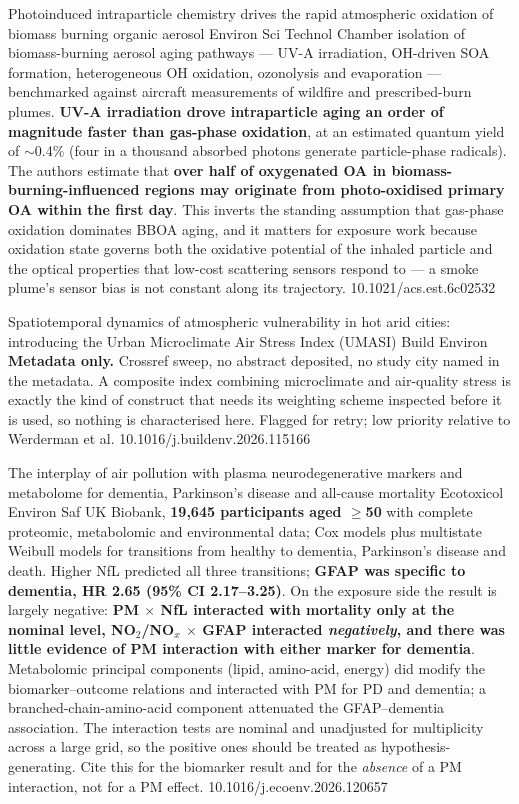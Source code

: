 \documentclass[10pt]{article}
\begin{document}
{Photoinduced intraparticle chemistry drives the rapid atmospheric oxidation of biomass burning organic aerosol}
{Environ Sci Technol}
{Chamber isolation of biomass-burning aerosol aging pathways --- UV-A irradiation,
OH-driven SOA formation, heterogeneous OH oxidation, ozonolysis and evaporation ---
benchmarked against aircraft measurements of wildfire and prescribed-burn plumes.
\textbf{UV-A irradiation drove intraparticle aging an order of magnitude faster than
gas-phase oxidation}, at an estimated quantum yield of $\sim$0.4\% (four in a thousand
absorbed photons generate particle-phase radicals). The authors estimate that
\textbf{over half of oxygenated OA in biomass-burning-influenced regions may originate
from photo-oxidised primary OA within the first day}. This inverts the standing
assumption that gas-phase oxidation dominates BBOA aging, and it matters for exposure
work because oxidation state governs both the oxidative potential of the inhaled particle
and the optical properties that low-cost scattering sensors respond to --- a smoke plume's
sensor bias is not constant along its trajectory.}
{10.1021/acs.est.6c02532}

{Spatiotemporal dynamics of atmospheric vulnerability in hot arid cities: introducing the Urban Microclimate Air Stress Index (UMASI)}
{Build Environ}
{\textbf{Metadata only.} Crossref sweep, no abstract deposited, no study city named in the
metadata. A composite index combining microclimate and air-quality stress is exactly the
kind of construct that needs its weighting scheme inspected before it is used, so nothing
is characterised here. Flagged for retry; low priority relative to Werderman et al.}
{10.1016/j.buildenv.2026.115166}

\clearpage


{The interplay of air pollution with plasma neurodegenerative markers and metabolome for dementia, Parkinson's disease and all-cause mortality}
{Ecotoxicol Environ Saf}
{UK Biobank, \textbf{19{,}645 participants aged $\geq$50} with complete proteomic,
metabolomic and environmental data; Cox models plus multistate Weibull models for
transitions from healthy to dementia, Parkinson's disease and death. Higher NfL predicted
all three transitions; \textbf{GFAP was specific to dementia, HR 2.65 (95\% CI
2.17--3.25)}. On the exposure side the result is largely negative: \textbf{PM $\times$
NfL interacted with mortality only at the nominal level, NO$_2$/NO$_x$ $\times$ GFAP
interacted \emph{negatively}, and there was little evidence of PM interaction with either
marker for dementia}. Metabolomic principal components (lipid, amino-acid, energy) did
modify the biomarker--outcome relations and interacted with PM for PD and dementia; a
branched-chain-amino-acid component attenuated the GFAP--dementia association. The
interaction tests are nominal and unadjusted for multiplicity across a large grid, so the
positive ones should be treated as hypothesis-generating. Cite this for the biomarker
result and for the \emph{absence} of a PM interaction, not for a PM effect.}
{10.1016/j.ecoenv.2026.120657}
\end{document}
